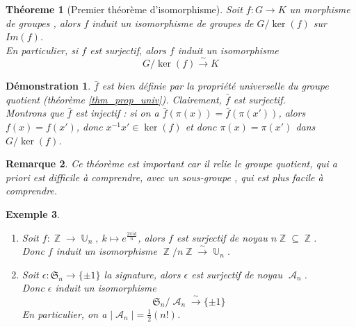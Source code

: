 \documentclass[a4paper, oneside]{report}
\theoremstyle{break}
\newtheorem{thm}{Théoreme}[section] %
\newtheorem{exem}[thm]{Exemple}
\newtheorem{remar}[thm]{Remarque}
\newtheorem*{demo}{Démonstration}
\newcommand{\mdg}{morphisme de groupes }
\newcommand{\isom}{isomorphisme }
\newcommand{\sg}{sous-groupe }
\newcommand{\fong}{\overset{\sim}{\rightarrow}}
\DeclareMathOperator{\Z}{\mathbb{Z}}
\DeclareMathOperator{\U}{\mathbb{U}}
\DeclareMathOperator{\A}{\mathcal{A}}
\renewcommand{\S}{\mathfrak{S}}
\newcommand{\fracun}[1]{\frac{1}{#1}}
\begin{document}
\begin{thm}[Premier théorème d'isomorphisme]
Soit $f:G\rightarrow K$ un \mdg, alors $f$ induit un isomorphisme de groupes de $G/\ker(f)$ sur $Im(f)$.\\
En particulier, si $f$ est surjectif, alors $f$ induit un isomorphisme
$$G/\ker(f)\fong K$$

\begin{center}
\end{center}
\end{thm}

\begin{demo}
$\bar{f}$ est bien définie par la propriété universelle du groupe quotient (théorème \ref{thm_prop_univ}). Clairement, $\bar{f}$ est surjectif.\\
Montrons que $\bar{f}$ est injectif : si on a $\bar{f}(\pi(x))=\bar{f}(\pi(x'))$, alors $f(x)=f(x')$, donc $x^{-1}x'\in \ker(f)$ et donc $\pi(x)=\pi(x')$ dans $G/\ker(f)$.
\end{demo}

\begin{remar}
Ce théorème est important car il relie le groupe quotient, qui a priori est difficile à comprendre, avec un \sg, qui est plus facile à comprendre.
\end{remar}

\begin{exem}
\begin{enumerate}
\item Soit $f:\Z \rightarrow \U_n,~k\mapsto e^{\frac{2\pi ik}{n}}$, alors $f$ est surjectif de noyau $n\Z \subseteq \Z$.\\
Donc $f$ induit un isomorphisme $\Z/n\Z \fong \U_n$.
\item Soit $\epsilon : \S_n \rightarrow \{\pm 1\}$ la signature, alors $\epsilon$ est surjectif de noyau $\A_n$.\\
Donc $\epsilon$ induit un \isom 
$$\S_n/\A_n \fong \{\pm 1\}$$
En particulier, on a $|\A_n| = \fracun{2}(n!)$.
\end{enumerate}
\end{exem}
\end{document}
